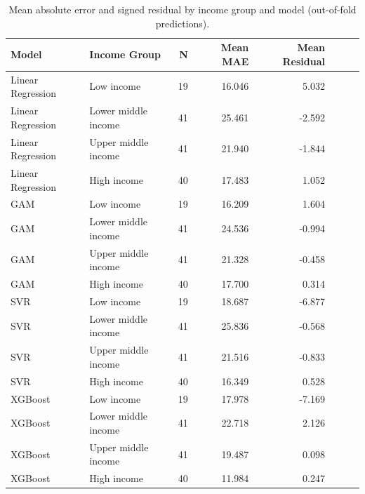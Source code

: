 \begin{table}[htbp]
    \centering
    \small
    \caption{Mean absolute error and signed residual by income group and model (out-of-fold predictions).}
    \label{tab:sq2_mae_by_group}
    \begin{tabular}{llrrrrrr}
        \toprule
        Model & Income Group & N & Mean MAE & Mean Residual \\
        \midrule
        Linear Regression & Low income & 19 & 16.046 & 5.032 \\
        Linear Regression & Lower middle income & 41 & 25.461 & -2.592 \\
        Linear Regression & Upper middle income & 41 & 21.940 & -1.844 \\
        Linear Regression & High income & 40 & 17.483 & 1.052 \\
        \midrule
        GAM & Low income & 19 & 16.209 & 1.604 \\
        GAM & Lower middle income & 41 & 24.536 & -0.994 \\
        GAM & Upper middle income & 41 & 21.328 & -0.458 \\
        GAM & High income & 40 & 17.700 & 0.314 \\
        \midrule
        SVR & Low income & 19 & 18.687 & -6.877 \\
        SVR & Lower middle income & 41 & 25.836 & -0.568 \\
        SVR & Upper middle income & 41 & 21.516 & -0.833 \\
        SVR & High income & 40 & 16.349 & 0.528 \\
        \midrule
        XGBoost & Low income & 19 & 17.978 & -7.169 \\
        XGBoost & Lower middle income & 41 & 22.718 & 2.126 \\
        XGBoost & Upper middle income & 41 & 19.487 & 0.098 \\
        XGBoost & High income & 40 & 11.984 & 0.247 \\
        \bottomrule
    \end{tabular}
\end{table}